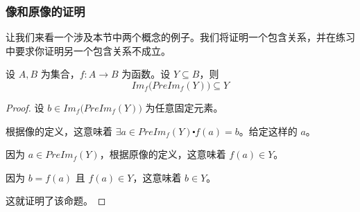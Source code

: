 \subsubsection*{像和原像的证明}

让我们来看一个涉及本节中两个概念的例子。我们将证明一个包含关系，并在练习中要求你证明另一个包含关系不成立。

\begin{proposition}\label{prop:proposition7.3.12}
    设 $A,B$ 为集合，$f:A \to B$ 为函数。设 $Y \subseteq B$，则
    \[Im_f \big(PreIm_f (Y)\big) \subseteq Y\]
\end{proposition}

\begin{proof}
    设 $b \in Im_f \big(PreIm_f (Y)\big)$ 为任意固定元素。

    根据像的定义，这意味着 $\exists a \in PreIm_f (Y) \centerdot f(a) = b$。给定这样的 $a$。

    因为 $a \in PreIm_f (Y)$，根据原像的定义，这意味着 $f(a) \in Y$。

    因为 $b = f(a)$ 且 $f(a) \in Y$，这意味着 $b \in Y$。

    这就证明了该命题。
\end{proof}

